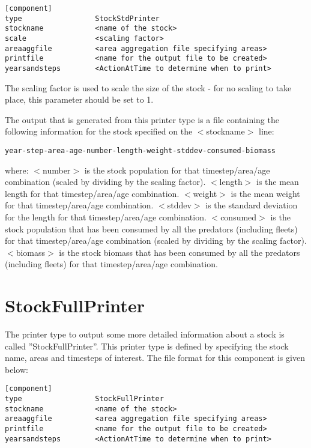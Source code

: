 \documentclass [a4paper, 10pt]{book}
\begin{document}
\begin{verbatim}
[component]
type                 StockStdPrinter
stockname            <name of the stock>
scale                <scaling factor>
areaaggfile          <area aggregation file specifying areas>
printfile            <name for the output file to be created>
yearsandsteps        <ActionAtTime to determine when to print>
\end{verbatim}

The scaling factor is used to scale the size of the stock - for no scaling to take place, this parameter should be set to 1.

\bigskip
The output that is generated from this printer type is a file containing the following information for the stock specified on the $<$stockname$>$ line:

\begin{verbatim}
year-step-area-age-number-length-weight-stddev-consumed-biomass
\end{verbatim}

where:\newline
$<$number$>$ is the stock population for that timestep/area/age combination (scaled by dividing by the scaling factor).\newline
$<$length$>$ is the mean length for that timestep/area/age combination.\newline
$<$weight$>$ is the mean weight for that timestep/area/age combination.\newline
$<$stddev$>$ is the standard deviation for the length for that timestep/area/age combination.\newline
$<$consumed$>$ is the stock population that has been consumed by all the predators (including fleets) for that timestep/area/age combination (scaled by dividing by the scaling factor).\newline
$<$biomass$>$ is the stock biomass that has been consumed by all the predators (including fleets) for that timestep/area/age combination.

\section{StockFullPrinter}\label{sec:stockfullprinter}
The printer type to output some more detailed information about a stock is called ''StockFullPrinter''.  This printer type is defined by specifying the stock name, areas and timesteps of interest.  The file format for this component is given below:

\begin{verbatim}
[component]
type                 StockFullPrinter
stockname            <name of the stock>
areaaggfile          <area aggregation file specifying areas>
printfile            <name for the output file to be created>
yearsandsteps        <ActionAtTime to determine when to print>
\end{verbatim}
\end{document}
